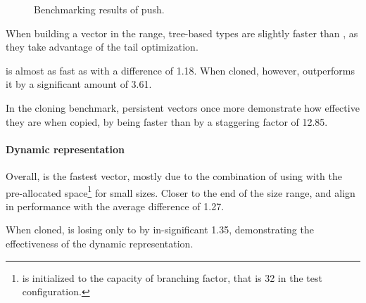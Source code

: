 \begin{figure}[!htbp]
\begin{adjustbox}{width=\textwidth}
    \end{adjustbox}

    \caption{Benchmarking results of push.}
    \label{fig:push}
\end{figure}

When building a vector in the \range{[20, 100]} range, tree-based types are slightly faster than \stdvec{}, as they take advantage of the tail optimization.

\imrsvec{} is almost as fast as \rbvec{} with a difference of 1.18. When cloned, however, \rbvec{} outperforms it by a significant amount of 3.61.

In the cloning benchmark, persistent vectors once more demonstrate how effective they are when copied, by \rbvec{} being faster than \stdvec{} by a staggering factor of 12.85.

\paragraph{Dynamic representation}
Overall, \pvec{} is the fastest vector, mostly due to the combination of using \stdvec{} with the pre-allocated space\footnote{\pvec{} is initialized to the capacity of branching factor, that is 32 in the test configuration.} for small sizes. Closer to the end of the size range, \stdvec{} and \pvec{} align in performance with the average difference of 1.27.

When cloned, \pvec{} is losing only to \rbvec{} by in-significant 1.35, demonstrating the effectiveness of the dynamic representation.

